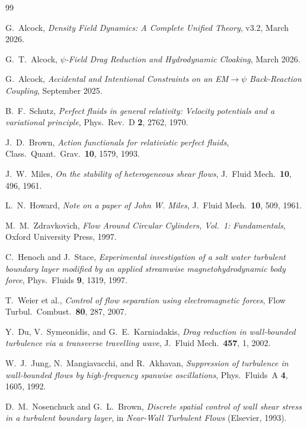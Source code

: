 \documentclass[12pt,twocolumn]{article}
\begin{document}
\begin{thebibliography}{99}

G.~Alcock, \emph{Density Field Dynamics: A Complete Unified Theory},
v3.2, March 2026.

G.~T.~Alcock, \emph{$\psi$-Field Drag Reduction and Hydrodynamic Cloaking},
March 2026.

G.~Alcock, \emph{Accidental and Intentional Constraints on an
EM$\to\psi$ Back-Reaction Coupling}, September 2025.

B.~F.~Schutz, \emph{Perfect fluids in general relativity: Velocity
potentials and a variational principle},
Phys.~Rev.~D \textbf{2}, 2762, 1970.

J.~D.~Brown, \emph{Action functionals for relativistic perfect fluids},
Class.~Quant.~Grav.~\textbf{10}, 1579, 1993.

J.~W.~Miles, \emph{On the stability of heterogeneous shear flows},
J.~Fluid Mech.~\textbf{10}, 496, 1961.

L.~N.~Howard, \emph{Note on a paper of John W. Miles},
J.~Fluid Mech.~\textbf{10}, 509, 1961.

M.~M.~Zdravkovich, \emph{Flow Around Circular Cylinders, Vol.~1:
Fundamentals}, Oxford University Press, 1997.

C.~Henoch and J.~Stace, \emph{Experimental investigation of a salt
water turbulent boundary layer modified by an applied streamwise
magnetohydrodynamic body force}, Phys.~Fluids \textbf{9}, 1319, 1997.

T.~Weier et al., \emph{Control of flow separation using
electromagnetic forces}, Flow Turbul.~Combust.~\textbf{80}, 287, 2007.

Y.~Du, V.~Symeonidis, and G.~E.~Karniadakis, \emph{Drag reduction in
wall-bounded turbulence via a transverse travelling wave},
J.~Fluid Mech.~\textbf{457}, 1, 2002.

W.~J.~Jung, N.~Mangiavacchi, and R.~Akhavan, \emph{Suppression of
turbulence in wall-bounded flows by high-frequency spanwise oscillations},
Phys.~Fluids~A \textbf{4}, 1605, 1992.

D.~M.~Nosenchuck and G.~L.~Brown, \emph{Discrete spatial control of
wall shear stress in a turbulent boundary layer}, in
\textit{Near-Wall Turbulent Flows} (Elsevier, 1993).


\end{thebibliography}
\end{document}
